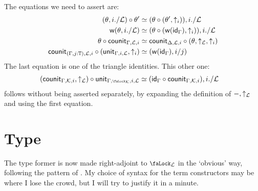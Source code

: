 \documentclass[10pt]{article}
\theoremstyle{definition}
\let\oldequiv\equiv%
\renewcommand{\equiv}{\simeq}
\newcommand{\defeq}{\oldequiv}
\newcommand*{\id}{\mathsf{id}}
\newcommand{\lock}{\mathchoice {\scalebox{0.8}{\text{\faLock}}}
  {\scalebox{0.8}{\text{\faLock}}} {\scalebox{0.5}{\text{\faLock}}}
  {\scalebox{0.4}{\text{\faLock}}} }
\newcommand{\Tiny}{\mathbb{T}}
\newcommand{\lockn}[1]{\mathcal{#1}}
\newcommand{\ctxlocke}[1]{\lock_{#1}}
\newcommand{\ctxlock}[1]{\ctxlocke{\lockn{#1}}}
\newcommand{\unit}[3]{\mathsf{unit}_{#1, #2, \lockn{#3}}}
\newcommand{\counit}[3]{\mathsf{counit}_{#1, \lockn{#2}, #3}}
\begin{document}
The equations we need to assert are:
\begin{align*}
  (\theta, i./\lockn{L}) \circ \theta' &\defeq (\theta \circ (\theta'\varfunc{i})), i./\lockn{L} \\
  \wksub{\theta, i./\lockn{L}} &\defeq (\theta \circ (\wksub{\id_\Gamma} \varfunc{i})), i./\lockn{L} \\
  \theta \circ \counit{\Gamma}{L}{i} &\defeq \counit{\Delta}{L}{i} \circ (\theta \lockfunc{L} \varfunc{i}) \\
  \counit{(\Gamma, j : \Tiny)}{L}{i} \circ (\unit{\Gamma}{i}{L} \varfunc{i}) &\defeq (\wksub{\id_\Gamma}, i/j)
\end{align*}
The last equation is one of the triangle identities. This other one:
\begin{align*}
  (\counit{\Gamma}{K}{i} \lockfunc{L}) \circ \unit{\Gamma, \ctxlock{K}}{i}{L} &\defeq (\id_\Gamma \circ \counit{\Gamma}{K}{i}), i./\lockn{L}
\end{align*}
follows without being asserted separately, by expanding the definition of $-\lockfunc{L}$ and using the first equation.


\section{Type}

The type former is now made right-adjoint to $\ctxlock{L}$ in the
`obvious' way, following the pattern of \cite{fitchtt}. My choice of
syntax for the term constructors may be where I lose the crowd, but I
will try to justify it in a minute.
\end{document}

